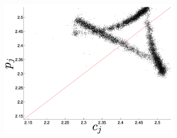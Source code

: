 \begin{figure}[htbp]
\begin{subfigure}{0.6\columnwidth}
  \end{subfigure}%
  \\
    \begin{subfigure}{0.6\columnwidth}
    \includegraphics[width=\columnwidth]{figs/colARIMAForecast.png}
    

\end{subfigure}
\end{figure}
